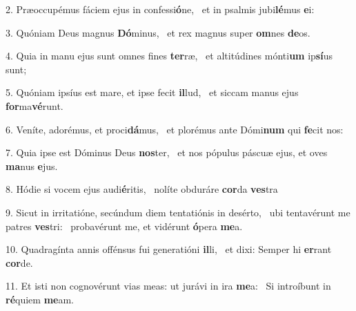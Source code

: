 2. Præoccupémus fáciem ejus in confessi\textbf{ó}ne, \ast\  et in psalmis jubi\textbf{lé}mus \textbf{e}i:\

3. Quóniam Deus magnus \textbf{Dó}minus, \ast\  et rex magnus super \textbf{om}nes \textbf{de}os.\

4. Quia in manu ejus sunt omnes fines \textbf{ter}ræ, \ast\  et altitúdines mónti\textbf{um} ip\textbf{sí}us sunt;\

5. Quóniam ipsíus est mare, et ipse fecit \textbf{il}lud, \ast\  et siccam manus ejus \textbf{for}ma\textbf{vé}runt.\

6. Veníte, adorémus, et proci\textbf{dá}mus, \ast\  et plorémus ante Dómi\textbf{num} qui \textbf{fe}cit nos:\

7. Quia ipse est Dóminus Deus \textbf{nos}ter, \ast\  et nos pópulus páscuæ ejus, et oves \textbf{ma}nus \textbf{e}jus.\

8. Hódie si vocem ejus audi\textbf{é}ritis, \ast\  nolíte obduráre \textbf{cor}da \textbf{ves}tra\

9. Sicut in irritatióne, secúndum diem tentatiónis in desérto, \dag\  ubi tentavérunt me patres \textbf{ves}tri: \ast\  probavérunt me, et vidérunt \textbf{ó}pera \textbf{me}a.\

10. Quadragínta annis offénsus fui generatióni \textbf{il}li, \ast\  et dixi: Semper hi \textbf{er}rant \textbf{cor}de.\

11. Et isti non cognovérunt vias meas: ut jurávi in ira \textbf{me}a: \ast\  Si introíbunt in \textbf{ré}quiem \textbf{me}am.\

